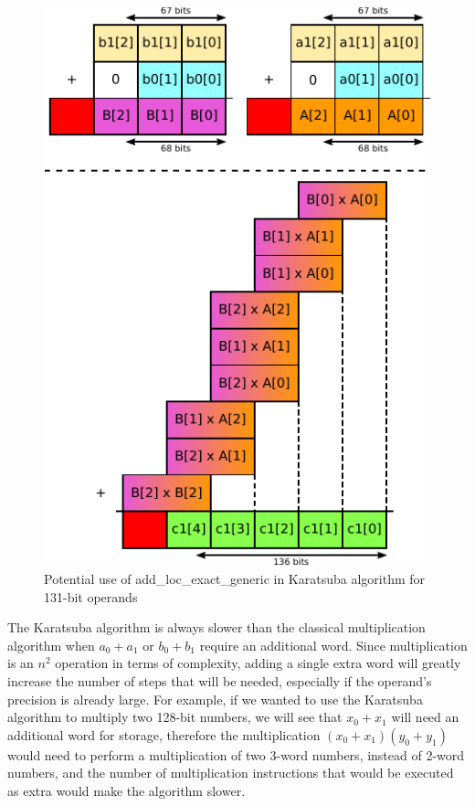 \documentclass[12pt, a4paper]{report}
\begin{document}
\begin{sloppypar}
\begin{figure}[h]
\centering
\includegraphics[scale=0.8]{figs/a0_plus_a1_karatsuba}
\caption{Potential use of add\_loc\_exact\_generic in Karatsuba algorithm for 131-bit operands}
\label{fig:a0_plus_a1_karatsuba}
\end{figure}

The Karatsuba algorithm is always slower than the classical multiplication algorithm
when $a_0 + a_1$ or $b_0 + b_1$ require an additional word.
Since multiplication is an $n^2$ operation in terms of complexity, adding a single
extra word will greatly increase the number of steps that will be needed, especially
if the operand's precision is already large.
For example, if we wanted to use the Karatsuba algorithm to multiply two 128-bit
numbers, we will see that $x_0 + x_1$ will need an additional word for storage,
therefore the multiplication $(x_0 + x_1) (y_0 + y_1)$ would need to perform a
multiplication of two 3-word numbers, instead of 2-word numbers, and the number
of multiplication instructions that would be executed as extra would make the
algorithm slower.


\end{sloppypar}
\end{document}
